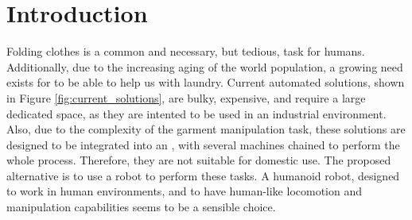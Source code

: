 \chapter{Introduction}
\label{introduction}

Folding clothes is a common and necessary, but tedious, task for humans. Additionally, due to the increasing aging of the world population, a growing need exists for 
to be able to help us with laundry. Current automated solutions, shown in Figure \ref{fig:current_solutions}, are bulky, expensive, and require a large dedicated space, as they are intented to be used in an industrial environment. Also, due to the complexity of the garment manipulation task,  these solutions are designed to be integrated into an , with several machines chained to perform the whole process. Therefore, they are not suitable for domestic use. The proposed alternative is to use a robot to perform these  tasks. A humanoid robot, designed to work in human environments, and to have human-like locomotion and manipulation capabilities seems to be a sensible choice.


